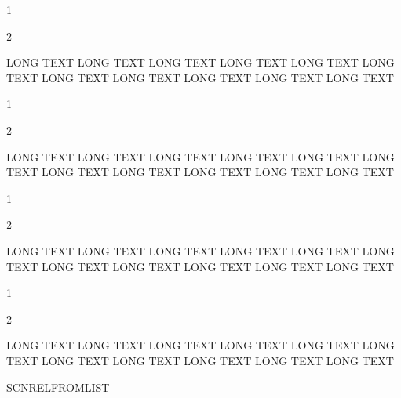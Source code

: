 

\begin{scnitemize}
\item 1
\item 2
\item LONG TEXT LONG TEXT LONG TEXT LONG TEXT LONG TEXT LONG TEXT LONG TEXT LONG TEXT LONG TEXT LONG TEXT LONG TEXT
\end{scnitemize}


\begin{scnitemizeii}
\item 1
\item 2
\item LONG TEXT LONG TEXT LONG TEXT LONG TEXT LONG TEXT LONG TEXT LONG TEXT LONG TEXT LONG TEXT LONG TEXT LONG TEXT
\end{scnitemizeii}


\begin{scnitemizeiii}
\item 1
\item 2
\item LONG TEXT LONG TEXT LONG TEXT LONG TEXT LONG TEXT LONG TEXT LONG TEXT LONG TEXT LONG TEXT LONG TEXT LONG TEXT
\end{scnitemizeiii}


\begin{scnenumerate}
\item 1
\item 2
\item LONG TEXT LONG TEXT LONG TEXT LONG TEXT LONG TEXT LONG TEXT LONG TEXT LONG TEXT LONG TEXT LONG TEXT LONG TEXT
\end{scnenumerate}


\begin{scnlist}
\end{scnlist}


\begin{scnrelfromlist}{SCNRELFROMLIST}
  \begin{scnindent}
  \end{scnindent}
\end{scnrelfromlist}


